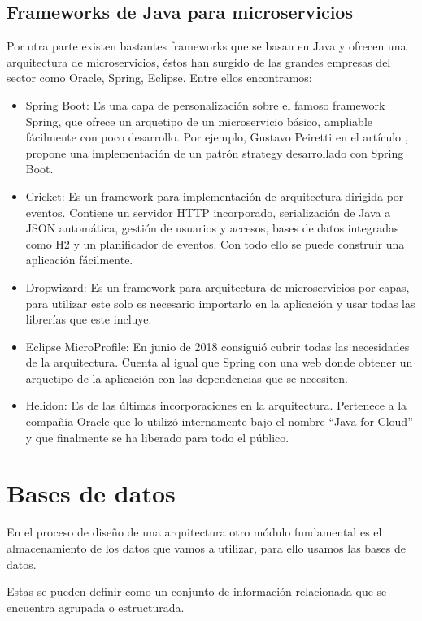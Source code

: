 \documentclass[12pt]{report} %
\begin{document}
 \subsection{Frameworks de Java para microservicios}
 Por otra parte existen bastantes frameworks que se basan en Java y ofrecen una arquitectura de microservicios, éstos han surgido de las grandes empresas del sector como Oracle, Spring, Eclipse. Entre ellos encontramos:

 \begin{itemize}
 	\item Spring Boot: Es una capa de personalización sobre el famoso framework Spring, que ofrece un arquetipo de un microservicio básico, ampliable fácilmente con poco desarrollo. Por ejemplo, Gustavo Peiretti en el artículo \cite{StrategySpringBoot}, propone una implementación de un patrón strategy desarrollado con Spring Boot.
 	\item Cricket: Es un framework para implementación de arquitectura dirigida por eventos. Contiene un servidor HTTP incorporado, serialización de Java a JSON automática, gestión de usuarios y accesos, bases de datos integradas como H2 y un planificador de eventos. Con todo ello se puede construir una aplicación fácilmente.
 	\item Dropwizard: Es un framework para arquitectura de microservicios por capas, para utilizar este solo es necesario importarlo en la aplicación y usar todas las librerías que este incluye.
 	\item Eclipse MicroProfile: En junio de 2018 consiguió cubrir todas las necesidades de la arquitectura. Cuenta al igual que Spring con una web donde obtener un arquetipo de la aplicación con las dependencias que se necesiten.
 	\item Helidon: Es de las últimas incorporaciones en la arquitectura. Pertenece a la compañía Oracle que lo utilizó internamente bajo el nombre “Java for Cloud” y que finalmente se ha liberado para todo el público. 
 \end{itemize}
	
	\section{Bases de datos}
	En el proceso de diseño de una arquitectura otro módulo fundamental es el almacenamiento de los datos que vamos a utilizar, para ello usamos las bases de datos.

	Estas se pueden definir como un conjunto de información relacionada que se encuentra agrupada o estructurada.
	
\end{document}

